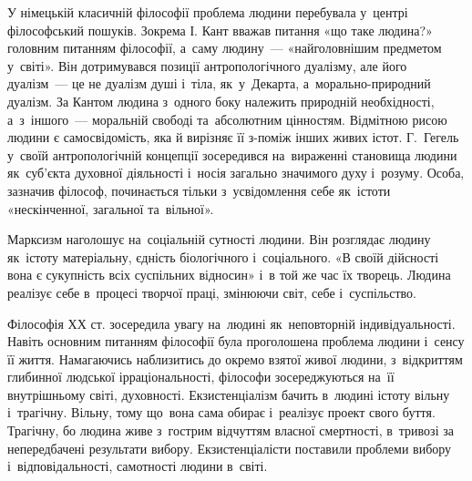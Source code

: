 \documentclass[a5paper,oneside,DIV=12,12pt,headings=small]{scrartcl}
\begin{document}
		У німецькій  класичній філософії проблема людини перебувала у~центрі філософський пошуків. Зокрема І. Кант вважав питання «що таке людина?» головним питанням філософії, а~саму людину~— «найголовнішим предметом у~світі». Він дотримувався позиції антропологічного дуалізму, але його дуалізм~— це не дуалізм душі і~тіла, як~у~Декарта, а~морально-природний дуалізм. За Кантом людина з~одного боку належить природній необхідності, а~з~іншого~— моральній свободі та~абсолютним цінностям. Відмітною рисою людини є самосвідомість, яка й вирізняє її з-поміж інших живих істот. Г. Гегель у~своїй антропологічній концепції зосередився на~вираженні становища людини як~суб'\-єк\-та духовної діяльності і~носія загально значимого духу і~розуму. Особа, зазначив філософ, починається тільки з~усвідомлення себе як~істоти «нескінченної, загальної та~вільної».
		
		Марксизм наголошує на~соціальній сутності людини. Він розглядає людину як~істоту матеріальну, єдність біологічного і~соціального. «В своїй дійсності вона є сукупність всіх суспільних відносин» і~в той же час їх творець. Людина реалізує себе в~процесі  творчої праці, змінюючи світ, себе і~суспільство.
		
		Філософія ХХ ст. зосередила увагу на~людині як~неповторній індивідуальності. Навіть основним питанням філософії була проголошена проблема людини і~сенсу її життя. Намагаючись наблизитись до окремо взятої живої людини, з~відкриттям глибинної людської ірраціональності, філософи зосереджуються на~її внутрішньому світі, духовності.  Екзистенціалізм бачить в~людині істоту вільну і~трагічну. Вільну, тому що~вона сама обирає і~реалізує проект свого буття. Трагічну, бо людина живе з~гострим відчуттям власної смертності, в~тривозі за непередбачені результати вибору. Екзистенціалісти поставили проблеми вибору і~відповідальності, самотності людини в~світі. 
\end{document}
